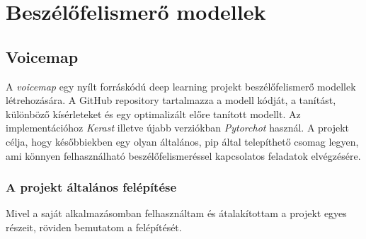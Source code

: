 \chapter{Beszélőfelismerő modellek}

\section{Voicemap}

A \emph{voicemap} egy nyílt forráskódú deep learning projekt beszélőfelismerő modellek létrehozására. A GitHub repository tartalmazza a modell kódját, a tanítást, különböző kísérleteket és egy optimalizált előre tanított modellt. Az implementációhoz \emph{Kerast} illetve újabb verziókban \emph{Pytorchot} használ.
\newline
\newline
A projekt célja, hogy későbbiekben egy olyan általános, pip által telepíthető csomag legyen, ami könnyen felhasználható beszélőfelismeréssel kapcsolatos feladatok elvégzésére.

\subsection{A projekt általános felépítése}

Mivel a saját alkalmazásomban felhasználtam és átalakítottam a projekt egyes részeit,
röviden bemutatom a felépítését.


